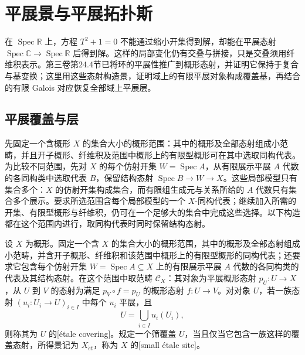 
\section{平展景与平展拓扑斯}
\label{b4:sec:E04}

在 \(\operatorname{Spec}\mathbb R\) 上，方程 \(T^2+1=0\) 不能通过缩小开集得到解，却能在平展态射 \(\operatorname{Spec}\mathbb C\rightarrow\operatorname{Spec}\mathbb R\) 后得到解。这样的局部变化仍有交叠与拼接，只是交叠须用纤维积表示。第三卷第24.4节已将环的平展性推广到概形态射，并证明它保持于复合与基变换；这里用这些态射构造景，证明域上的有限平展对象构成覆盖基，再结合的有限 Galois 对应恢复全部域上平展层。

\subsection{平展覆盖与层}
\label{b4:subsec:E04:01}

先固定一个含概形 \(X\) 的集合大小的概形范围：其中的概形及全部态射组成小范畴，并且开子概形、纤维积及范围中概形上的有限型概形可在其中选取同构代表。为比较不同范围，先对 \(X\) 的每个仿射开集 \(W=\operatorname{Spec}A\)，从有限展示平展 \(A\) 代数的各同构类中选取代表 \(B\)，保留结构态射 \(\operatorname{Spec}B\rightarrow W\rightarrow X\)。这些局部模型只有集合多个：\(X\) 的仿射开集构成集合，而有限组生成元与关系所给的 \(A\) 代数只有集合多个展示。要求所选范围含每个局部模型的一个 \(X\)-同构代表；继续加入所需的开集、有限型概形与纤维积，仍可在一个足够大的集合中完成这些选择。以下构造都在这个范围内进行，取同构代表时同时保留结构态射。

\begin{definition}\label{b4:def:small-etale-site}
	设 \(X\) 为概形。固定一个含 \(X\) 的集合大小的概形范围，其中的概形及全部态射组成小范畴，并含开子概形、纤维积和该范围中概形上的有限型概形的同构代表；还要求它包含每个仿射开集 \(W=\operatorname{Spec}A\subseteq X\) 上的有限展示平展 \(A\) 代数的各同构类的代表及其结构态射。在这个范围中取范畴 \(\mathcal C_X\)：其对象为平展概形态射 \(p_U:U\rightarrow X\)，从 \(U\) 到 \(V\) 的态射为满足 \(p_V\circ f=p_U\) 的概形态射 \(f:U\rightarrow V\)。对对象 \(U\)，若一族态射 \((u_i:U_i\rightarrow U)_{i\in I}\) 中每个 \(u_i\) 平展，且
	\[
		U=\bigcup_{i\in I}u_i(U_i),
	\]
	则称其为 \(U\) 的[étale covering]。规定一个筛覆盖 \(U\)，当且仅当它包含一族这样的覆盖态射，所得景记为 \(X_{\acute{e}t}\)，称为 \(X\) 的[small étale site]。
\end{definition}


